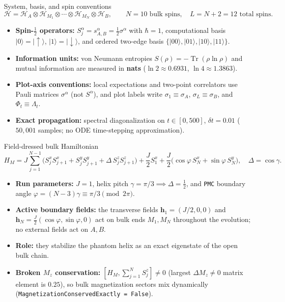 \documentclass[aspectratio=169,11pt]{beamer}
\newcommand{\ket}[1]{\lvert #1\rangle}
\newcommand{\Tr}{\operatorname{Tr}}
\begin{document}
\begin{frame}{System, basis, and spin conventions}
\small
\[
\mathcal H = \mathcal H_A \otimes \mathcal H_{M_1}\otimes\cdots\otimes\mathcal H_{M_N}\otimes\mathcal H_B,\qquad
N=10\text{ bulk spins},\quad L=N+2=12\text{ total spins}.
\]
\begin{itemize}\setlength\itemsep{5pt}
\item \textbf{Spin-$\tfrac12$ operators:} $S_j^\alpha = s_{A,B}^\alpha = \tfrac12\sigma^\alpha$ with $\hbar=1$, computational basis $\ket0=\ket\uparrow$, $\ket1=\ket\downarrow$, and ordered two-edge basis $\{\ket{00},\ket{01},\ket{10},\ket{11}\}$.
\item \textbf{Information units:} von Neumann entropies $S(\rho)=-\Tr(\rho\ln\rho)$ and mutual information are measured in \textbf{nats} ($\ln 2\approx 0.6931$, $\ln 4\approx 1.3863$).
\item \textbf{Plot-axis conventions:} local expectations and two-point correlators use Pauli matrices $\sigma^\alpha$ (not $S^\alpha$), and plot labels write $\sigma_1\equiv\sigma_A$, $\sigma_L\equiv\sigma_B$, and $\Phi_t\equiv\Lambda_t$.
\item \textbf{Exact propagation:} spectral diagonalization on $t\in[0,500]$, $\delta t=0.01$ ($50{,}001$ samples; no ODE time-stepping approximation).
\end{itemize}
\end{frame}

\begin{frame}{Field-dressed bulk Hamiltonian}
\small
\[
H_M = J\sum_{j=1}^{N-1}\bigl(S_j^xS_{j+1}^x + S_j^yS_{j+1}^y + \Delta\,S_j^zS_{j+1}^z\bigr)
+ \frac{J}{2}S_1^x + \frac{J}{2}\bigl(\cos\varphi\,S_N^x + \sin\varphi\,S_N^y\bigr),\quad \Delta=\cos\gamma .
\]
\begin{itemize}\setlength\itemsep{5pt}
\item \textbf{Run parameters:} $J=1$, helix pitch $\gamma=\pi/3 \implies \Delta=\tfrac12$, and \texttt{PMC} boundary angle $\varphi=(N-3)\gamma \equiv \pi/3 \pmod{2\pi}$.
\item \textbf{Active boundary fields:} the transverse fields $\mathbf h_1=(J/2,0,0)$ and $\mathbf h_N=\tfrac{J}{2}(\cos\varphi,\sin\varphi,0)$ act on bulk ends $M_1,M_N$ throughout the evolution; no external fields act on $A,B$.
\item \textbf{Role:} they stabilize the phantom helix as an exact eigenstate of the open bulk chain.
\item \textbf{Broken $M_z$ conservation:} $[H_M,\sum_{j=1}^N S_j^z]\neq 0$ (largest $\Delta M_z\neq 0$ matrix element is $0.25$), so bulk magnetization sectors mix dynamically (\texttt{MagnetizationConservedExactly = False}).
\end{itemize}
\end{frame}
\end{document}
